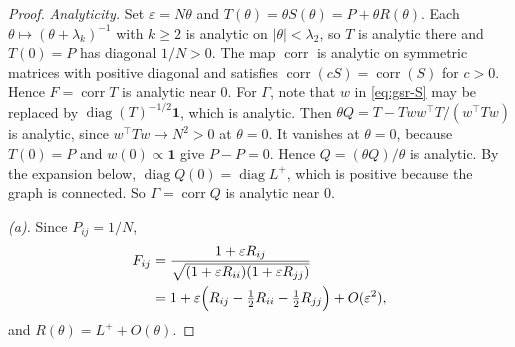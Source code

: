 \begin{proof}
\emph{Analyticity.} Set $\varepsilon=N\theta$ and $T(\theta)=\theta S(\theta)=P+\theta R(\theta)$. Each
$\theta\mapsto(\theta+\lambda_k)^{-1}$ with $k\ge2$ is analytic on $|\theta|<\lambda_2$, so $T$ is
analytic there and $T(0)=P$ has diagonal $1/N>0$. The map $\operatorname{corr}$ is analytic on
symmetric matrices with positive diagonal and satisfies $\operatorname{corr}(cS)=\operatorname{corr}(S)$
for $c>0$. Hence $F=\operatorname{corr}T$ is analytic near $0$. For $\Gamma$, note that $w$ in \eqref{eq:gsr-S} may be
replaced by $\operatorname{diag}(T)^{-1/2}\mathbf 1$, which is analytic. Then
$\theta Q=T-Tww^{\top}T/(w^{\top}Tw)$ is analytic, since $w^{\top}Tw\to N^{2}>0$ at $\theta=0$. It
vanishes at $\theta=0$, because $T(0)=P$ and $w(0)\propto\mathbf 1$ give $P-P=0$. Hence
$Q=(\theta Q)/\theta$ is analytic. By the expansion below,
$\operatorname{diag}Q(0)=\operatorname{diag}L^{+}$, which is positive because the graph is connected. So $\Gamma=\operatorname{corr}Q$ is analytic near $0$.

\emph{(a).} Since $P_{ij}=1/N$,
\begin{align*}
  F_{ij}&=\frac{1+\varepsilon R_{ij}}{\sqrt{(1+\varepsilon R_{ii})(1+\varepsilon R_{jj})}}\\
  &=1+\varepsilon\Bigl(R_{ij}-\tfrac12R_{ii}-\tfrac12R_{jj}\Bigr)+O(\varepsilon^{2}),
\end{align*}
and $R(\theta)=L^{+}+O(\theta)$.


\end{proof}
